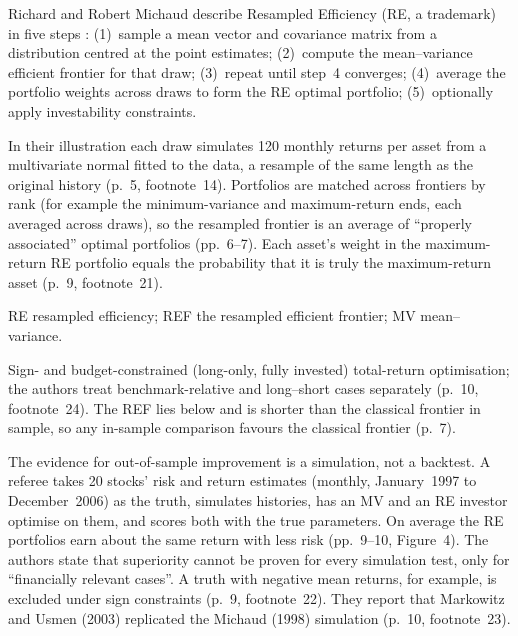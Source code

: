 \begin{qfmethod}\label{meth:resampled-efficiency}
 Richard and Robert Michaud describe Resampled Efficiency (RE, a trademark) in five steps \citep[authors' version \copyright~2007, p.~5]{michaud-michaud-2008-wp}: (1)~sample a mean vector and covariance matrix from a distribution centred at the point estimates; (2)~compute the mean--variance efficient frontier for that draw; (3)~repeat until step~4 converges; (4)~average the portfolio weights across draws to form the RE optimal portfolio; (5)~optionally apply investability constraints.

In their illustration each draw simulates 120 monthly returns per asset from a multivariate normal fitted to the data, a resample of the same length as the original history (p.~5, footnote~14). Portfolios are matched across frontiers by rank (for example the minimum-variance and maximum-return ends, each averaged across draws), so the resampled frontier is an average of ``properly associated'' optimal portfolios (pp.~6--7). Each asset's weight in the maximum-return RE portfolio equals the probability that it is truly the maximum-return asset (p.~9, footnote~21).

 RE resampled efficiency; REF the resampled efficient frontier; MV mean--variance.

 Sign- and budget-constrained (long-only, fully invested) total-return optimisation; the authors treat benchmark-relative and long--short cases separately (p.~10, footnote~24). The REF lies below and is shorter than the classical frontier in sample, so any in-sample comparison favours the classical frontier (p.~7).

 The evidence for out-of-sample improvement is a simulation, not a backtest. A referee takes 20 stocks' risk and return estimates (monthly, January~1997 to December~2006) as the truth, simulates histories, has an MV and an RE investor optimise on them, and scores both with the true parameters. On average the RE portfolios earn about the same return with less risk (pp.~9--10, Figure~4). The authors state that superiority cannot be proven for every simulation test, only for ``financially relevant cases''. A truth with negative mean returns, for example, is excluded under sign constraints (p.~9, footnote~22). They report that Markowitz and Usmen (2003) replicated the Michaud (1998) simulation (p.~10, footnote~23).


\end{qfmethod}
